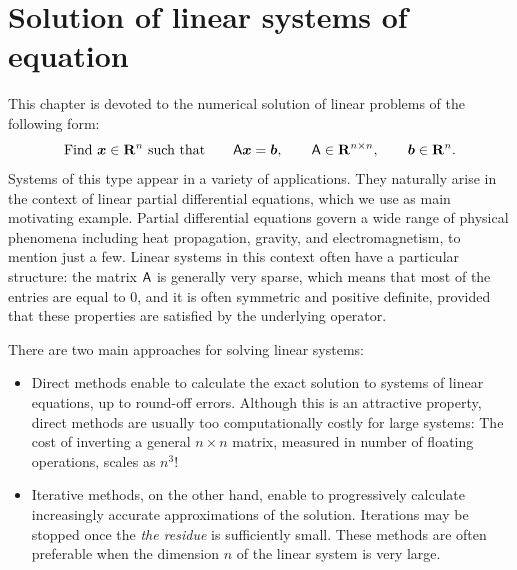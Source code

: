 \chapter{Solution of linear systems of equation}
\label{cha:solution_of_linear_systems}
\minitoc

This chapter is devoted to the numerical solution of linear problems of the following form:
\begin{equation}
    \label{eq:linear_system}
    \text{Find $\mathbf{\boldsymbol{x}} \in \mathbf R^n$ such that} \qquad
    \mathsf A \mathbf{\boldsymbol{x}} = \mathbf{\boldsymbol{b}},
    \qquad \mathsf A \in \mathbf R^{n \times n},
    \qquad \mathbf{\boldsymbol{b}} \in \mathbf R^n.
\end{equation}
Systems of this type appear in a variety of applications.
They naturally arise in the context of linear partial differential equations,
which we use as main motivating example.
Partial differential equations govern a wide range of physical phenomena including heat propagation, gravity, and electromagnetism,
to mention just a few.
Linear systems in this context often have a particular structure:
the matrix $\mathsf A$ is generally very sparse,
which means that most of the entries are equal to 0,
and it is often symmetric and positive definite,
provided that these properties are satisfied by the underlying operator.

There are two main approaches for solving linear systems:
\begin{itemize}
    \item
        Direct methods enable to calculate the exact solution to systems of linear equations,
        up to round-off errors.
        Although this is an attractive property,
        direct methods are usually too computationally costly for large systems:
        The cost of inverting a general $n \times n$ matrix,
        measured in number of floating operations,
        scales as $n^3$!

    \item
        Iterative methods, on the other hand,
        enable to progressively calculate increasingly accurate approximations of the solution.
        Iterations may be stopped once the \emph{the residue} is sufficiently small.
        These methods are often preferable when the dimension $n$ of the linear system is very large.
\end{itemize}

